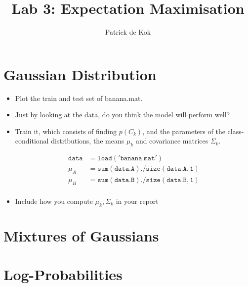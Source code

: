 \documentclass[a4paper,11pt]{article}
\title{Lab 3: Expectation Maximisation}
\author{Patrick de Kok}
\begin{document}
\maketitle

\section{Gaussian Distribution}
\begin{itemize}
  \item Plot the train and test set of banana.mat.
  \item Just by looking at the data, do you think the model will perform well?
  \item Train it, which consists of finding $p(C_k)$, and the parameters of the class-conditional distributions, the means $\mu_k$ and covariance matrices $\Sigma_k$.

    \begin{align*}
      \mathtt{data} &\mathtt{= load('banana.mat')} \\
      \mu_A &= \mathtt{sum(data.A) ./ size(data.A, 1)} \\
      \mu_B &= \mathtt{sum(data.B) ./ size(data.B, 1)} \\
    \end{align*}
  \item Include how you compute $\mu_k,\Sigma_k$ in your report
\end{itemize}

\section{Mixtures of Gaussians}

\section{Log-Probabilities}
\end{document}
